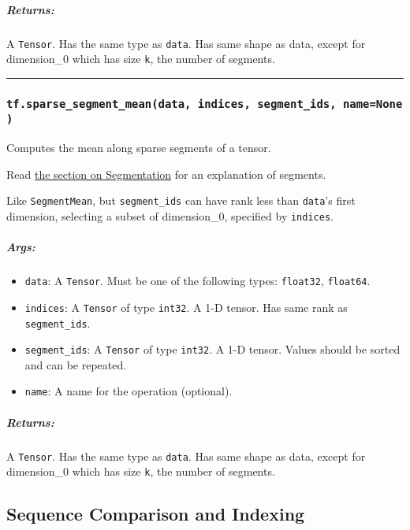 \subparagraph{Returns: }\label{returns-52}

A \texttt{Tensor}. Has the same type as \texttt{data}. Has same shape as
data, except for dimension\_0 which has size \texttt{k}, the number of
segments.

\begin{center}\rule{0.5\linewidth}{\linethickness}\end{center}

\subsubsection{\texorpdfstring{\texttt{tf.sparse\_segment\_mean(data,\ indices,\ segment\_ids,\ name=None)}
}{tf.sparse\_segment\_mean(data, indices, segment\_ids, name=None) }}\label{tf.sparseux5fsegmentux5fmeandata-indices-segmentux5fids-namenone}

Computes the mean along sparse segments of a tensor.

Read \href{../../api_docs/python/math_ops.md\#segmentation}{the section
on Segmentation} for an explanation of segments.

Like \texttt{SegmentMean}, but \texttt{segment\_ids} can have rank less
than \texttt{data}'s first dimension, selecting a subset of
dimension\_0, specified by \texttt{indices}.

\subparagraph{Args: }\label{args-53}

\begin{itemize}
\tightlist
\item
  \texttt{data}: A \texttt{Tensor}. Must be one of the following types:
  \texttt{float32}, \texttt{float64}.
\item
  \texttt{indices}: A \texttt{Tensor} of type \texttt{int32}. A 1-D
  tensor. Has same rank as \texttt{segment\_ids}.
\item
  \texttt{segment\_ids}: A \texttt{Tensor} of type \texttt{int32}. A 1-D
  tensor. Values should be sorted and can be repeated.
\item
  \texttt{name}: A name for the operation (optional).
\end{itemize}

\subparagraph{Returns: }\label{returns-53}

A \texttt{Tensor}. Has the same type as \texttt{data}. Has same shape as
data, except for dimension\_0 which has size \texttt{k}, the number of
segments.

\subsection{Sequence Comparison and Indexing
}\label{sequence-comparison-and-indexing}

